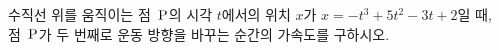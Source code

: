 수직선 위를 움직이는 점~$\mathrm{P}$의 시각 $t$에서의 위치 $x$가 $x=-t^3+5t^2-3t+2$일 때, 점~$\mathrm{P}$가 두 번째로 운동 방향을 바꾸는 순간의 가속도를 구하시오.
